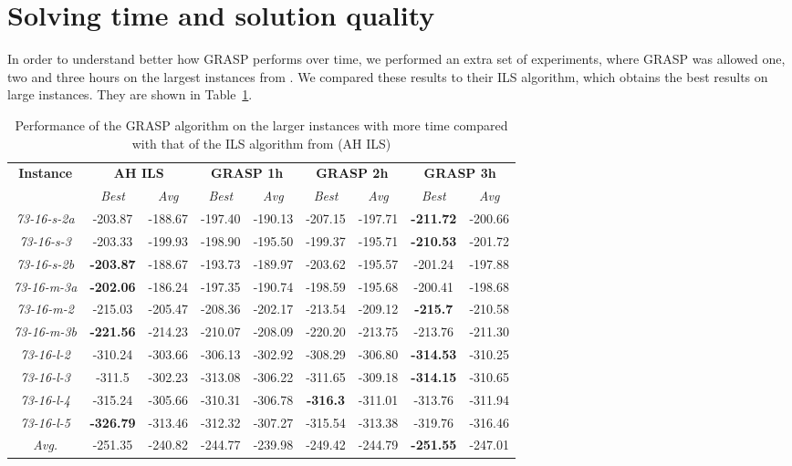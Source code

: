 \documentclass[a4paper,11pt]{elsarticle}
\begin{document}
\section{Solving time and solution quality}\label{appendix:allowing_extra_time}
In order to understand better how GRASP performs over time, we performed an extra set of experiments, where GRASP was allowed one, two and three hours on the largest instances from \cite{AitHaddadene2016}. We compared these results to their ILS algorithm, which obtains the best results on large instances. They are shown in Table~\ref{tab:longer_experiments}.
{\footnotesize
\begin{longtable}{c|cc|cc|cc|cc}
\caption{Performance of the GRASP algorithm on the larger instances with more time compared with that of the ILS algorithm from \cite{AitHaddadene2016} (AH ILS)}
\label{tab:longer_experiments}\\
\hline
\textbf{Instance}  & \multicolumn{2}{c|}{\textbf{AH ILS}} & \multicolumn{2}{c|}{\textbf{GRASP 1h}} & \multicolumn{2}{c|}{\textbf{GRASP 2h}} & \multicolumn{2}{c}{\textbf{GRASP 3h}}\\
    & \emph{Best} & \emph{Avg} & \emph{Best} & \emph{Avg} & \emph{Best} & \emph{Avg} & \emph{Best} & \emph{Avg}\\
\hline                                              
    \hline																		
        \emph{73-16-s-2a}   	&	-203.87	&	-188.67	&	-197.40	&	-190.13	&	-207.15	&	-197.71	&	\textbf{-211.72}	&	-200.66	    \\	
        \emph{73-16-s-3}    	&	-203.33	&	-199.93	&	-198.90	&	-195.50	&	-199.37	&	-195.71	&	\textbf{-210.53}	&	-201.72	    \\	
        \emph{73-16-s-2b}   	&	\textbf{-203.87}	&	-188.67	&	-193.73	&	-189.97	&	-203.62	&	-195.57	&	-201.24	&	-197.88	    \\	
        \emph{73-16-m-3a}   	&	\textbf{-202.06}	&	-186.24	&	-197.35	&	-190.74	&	-198.59	&	-195.68	&	-200.41	&	-198.68	    \\	
        \emph{73-16-m-2}    	&	-215.03	&	-205.47	&	-208.36	&	-202.17	&	-213.54	&	-209.12	&	\textbf{-215.7}	&	-210.58	    \\	
        \emph{73-16-m-3b}   	&	\textbf{-221.56}	&	-214.23	&	-210.07	&	-208.09	&	-220.20	&	-213.75	&	-213.76	&	-211.30	    \\	
        \emph{73-16-l-2}    	&	-310.24	&	-303.66	&	-306.13	&	-302.92	&	-308.29	&	-306.80	&	\textbf{-314.53}	&	-310.25	    \\	
        \emph{73-16-l-3}    	&	-311.5	&	-302.23	&	-313.08	&	-306.22	&	-311.65	&	-309.18	&	\textbf{-314.15}	&	-310.65	    \\	
        \emph{73-16-l-4}    	&	-315.24	&	-305.66	&	-310.31	&	-306.78	&	\textbf{-316.3}	&	-311.01	&	-313.76	&	-311.94	    \\	
        \emph{73-16-l-5}    	&	\textbf{-326.79}	&	-313.46	&	-312.32	&	-307.27	&	-315.54	&	-313.38	&	-319.76	&	-316.46	    \\	\hline
\emph{Avg.}	&	-251.35	&	-240.82	&	-244.77	&	-239.98	&	-249.42	&	-244.79	&	\textbf{-251.55}	&	-247.01	    \\	

\hline
\end{longtable}
}
\end{document}
